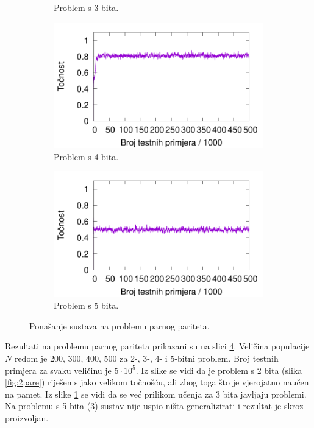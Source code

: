 \documentclass[times, utf8, zavrsni]{fer}
\begin{document}
\begin{figure}[!h]
\begin{subfigure}{0.496\textwidth}
        \caption{Problem s 3 bita.}
        \label{fig:3pare}
    \end{subfigure}
    \begin{subfigure}{0.496\textwidth}
        \centering
        \includegraphics[width=\textwidth]{img/parity/4pare.pdf}
        \caption{Problem s 4 bita.}
        \label{fig:4pare}
    \end{subfigure}
    \begin{subfigure}{0.496\textwidth}
        \centering
        \includegraphics[width=\textwidth]{img/parity/5pare.pdf}
        \caption{Problem s 5 bita.}
        \label{fig:5pare}
    \end{subfigure}
    \caption{Ponašanje sustava na problemu parnog pariteta.}
    \label{fig:pare}
\end{figure}
Rezultati na problemu parnog pariteta prikazani su na slici \ref{fig:pare}.
Veličina populacije $N$ redom je 200, 300, 400, 500 za 2-, 3-, 4- i 5-bitni problem.
Broj testnih primjera za svaku veličinu je $5 \cdot 10^{5}$.
Iz slike se vidi da je problem s 2 bita (slika \ref{fig:2pare}) riješen s jako velikom točnošću, ali zbog toga što je vjerojatno naučen na pamet.
Iz slike \ref{fig:3pare} se vidi da se već prilikom učenja za 3 bita javljaju problemi.
Na problemu s 5 bita (\ref{fig:5pare}) sustav nije uspio ništa generalizirati i rezultat je skroz proizvoljan.
\end{document}
